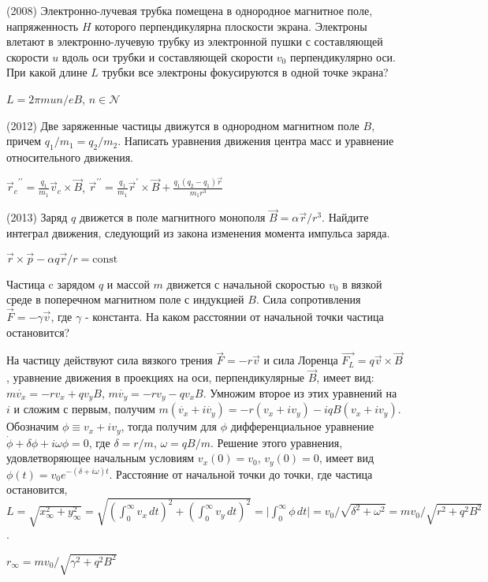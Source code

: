 \begin{ex}
(2008) Электронно-лучевая трубка помещена в однородное магнитное поле, напряженность $H$ которого перпендикулярна плоскости экрана. Электроны влетают в электронно-лучевую трубку из электронной пушки с составляющей скорости $u$ вдоль оси трубки и составляющей скорости $v_0$ перпендикулярно оси. При какой длине $L$ трубки все электроны фокусируются в одной точке экрана?
\begin{ans}
$L=2\pi m u n/ eB$, $n \in \mathcal{N}$
\end{ans}
\end{ex}

\begin{ex}
(2012) Две заряженные частицы движутся в однородном магнитном поле $B$, причем $q_1/m_1 = q_2/m_2$. Написать уравнения движения центра масс и уравнение относительного движения.
\begin{ans}
${\vec{r}_c}^{\prime \prime} = \frac{q_1}{m_1}\vec{v}_c \times \vec B$, 
${\vec{r}}^{\prime \prime} = \frac{q_1}{m_1}\vec{r}^{\prime} \times \vec B + \frac{q_1(q_2-q_1)\vec r}{m_1 r^3}$
\end{ans}
\end{ex}

\begin{ex}
(2013) Заряд $q$ движется в поле магнитного монополя $\vec{B} = \alpha \vec{r}/r^3$. Найдите интеграл движения, следующий из закона изменения момента импульса заряда.
\begin{ans}
$\vec r \times \vec p - \alpha q \vec r/ r = \text{const} $
\end{ans}
\end{ex}

\begin{ex}
Частица c зарядом $q$ и массой $m$ движется с начальной скоростью $v_0$ в вязкой среде в поперечном магнитном поле с индукцией $B$. Сила сопротивления $\vec{F} = -\gamma \vec{v}$, где $\gamma$ - константа. На каком расстоянии от начальной точки частица остановится?
\begin{sol}
На частицу действуют сила вязкого трения $\vec{F} = - r\vec{v}$ и сила Лоренца $\vec{F_L} = q \vec{v} \times \vec{B}$, уравнение движения в проекциях на оси, перпендикулярные $\vec{B}$, имеет вид:  $m \dot{v_x}=-rv_x+q v_y B$, $m \dot{v_y}=-rv_y-q v_x B$. Умножим второе из этих уравнений на $i$ и сложим с первым, получим $m\left( \dot{v_x} +i \dot{v_y} \right) = -r(v_x+i v_y) - iqB(v_x+i v_y)$. Обозначим $\phi \equiv v_x+i v_y$, тогда получим для $\phi$ дифференциальное уравнение $\dot{\phi} + \delta \phi + i\omega \phi=0$, где $\delta=r/m$,  $\omega=qB/m$. Решение этого уравнения, удовлетворяющее начальным условиям $v_x(0)=v_0$, $v_y(0)=0$, имеет вид $\phi(t)=v_0 e^{-(\delta +i\omega) t}$. Расстояние от начальной точки до точки, где частица остановится, $L=\sqrt{x_{\infty}^2 + y_{\infty}^2} =\sqrt{ \left( \int_{0}^{\infty}{v_x \, dt} \right)^2 + \left( \int_{0}^{\infty}{v_y \, dt} \right)^2}=\vert \int_{0}^{\infty}{ \phi \, dt} \vert=v_0/\sqrt{\delta^2 +\omega^2}=m v_0/\sqrt{r^2+q^2B^2}$.
\end{sol}
\begin{ans}
$r_{\infty} = mv_0/\sqrt{\gamma^2 + q^2B^2}$
\end{ans}
\end{ex}

